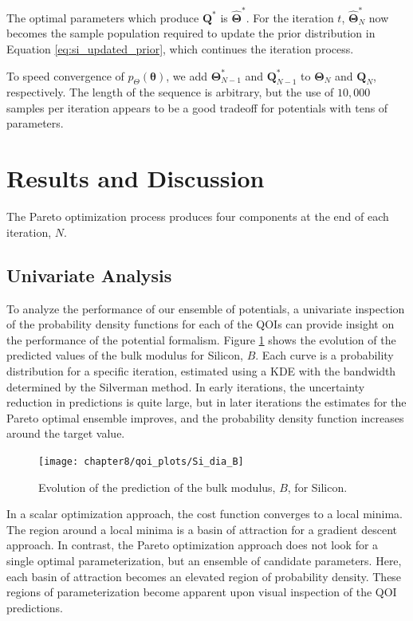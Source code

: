 The optimal parameters which produce $\bm{Q}^*$ is $\hat{\bm{\Theta}}^*$.  For the iteration $t$, $\hat{\bm{\Theta}}_{N}^*$ now becomes the sample population required to update the prior distribution in Equation \ref{eq:si_updated_prior}, which continues the iteration process.

To speed convergence of $p_{\Theta}(\bm{\theta})$, we add $\bm{\Theta}_{N-1}^*$ and $\bm{Q}_{N-1}^*$ to $\bm{\Theta}_{N}$ and $\bm{Q}_{N}$, respectively.  The length of the sequence is arbitrary, but the use of $10,000$ samples per iteration appears to be a good tradeoff for potentials with tens of parameters.

\section{Results and Discussion}

The Pareto optimization process produces four components at the end of each iteration, $N$.

\subsection{Univariate Analysis}
To analyze the performance of our ensemble of potentials, a univariate inspection of the probability density functions for each of the QOIs can provide insight on the performance of the potential formalism.
Figure \ref{fig:Si_qoi_B} shows the evolution of the predicted values of the bulk modulus for Silicon, $B$.  Each curve is a probability distribution for a specific iteration, estimated using a KDE with the bandwidth determined by the Silverman method\cite{silverman1986_kde}.
In early iterations, the uncertainty reduction in predictions is quite large, but in later iterations the estimates for the Pareto optimal ensemble improves, and the probability density function increases around the target value.

\begin{figure}[h]
	\centering
	\texttt{[image: chapter8/qoi\_plots/Si\_dia\_B]}
	\caption{Evolution of the prediction of the bulk modulus, $B$, for Silicon.}
	\label{fig:Si_qoi_B}
\end{figure}

In a scalar optimization approach, the cost function converges to a local minima.  The region around a local minima is a basin of attraction for a gradient descent approach.  In contrast, the Pareto optimization approach does not look for a single optimal parameterization, but an ensemble of candidate parameters.  Here, each basin of attraction becomes an elevated region of probability density.  These regions of parameterization become apparent upon visual inspection of the QOI predictions.

